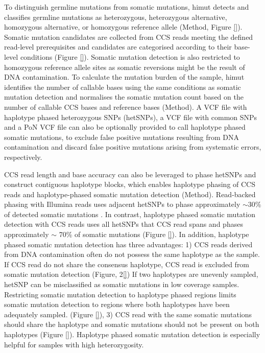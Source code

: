 To distinguish germline mutations from somatic mutations, himut detects and classifies germline mutations as heterozygous, heterozygous alternative, homozygous alternative, or homozygous reference allele (Method, Figure \ref{}). Somatic mutation candidates are collected from CCS reads meeting the defined read-level prerequisites and candidates are categorised according to their base-level conditions (Figure \ref{}). Somatic mutation detection is also restricted to homozygous reference allele sites as somatic reversions might be the result of DNA contamination. To calculate the mutation burden of the sample, himut identifies the number of callable bases using the same conditions as somatic mutation detection and normalises the somatic mutation count based on the number of callable CCS bases and reference bases (Method). A VCF file with haplotype phased heterozygous SNPs (hetSNPs), a VCF file with common SNPs and a PoN VCF file can also be optionally provided to call haplotype phased somatic mutations, to exclude false positive mutations resulting from DNA contamination and discard false positive mutations arising from systematic errors, respectively. 

CCS read length and base accuracy can also be leveraged to phase hetSNPs and construct contiguous haplotype blocks, which enables haplotype phasing of CCS reads and haplotype-phased somatic mutation detection (Method). Read-backed phasing with Illumina reads uses adjacent hetSNPs to phase approximately $\sim$30\% of detected somatic mutations \cite{}. In contrast, haplotype phased somatic mutation detection with CCS reads uses all hetSNPs that CCS read spans and phases approximately $\sim$ 70\% of somatic mutations (Figure \ref{}). In addition, haplotype phased somatic mutation detection has three advantages: 1) CCS reads derived from DNA contamination often do not possess the same haplotype as the sample. If CCS read do not share the consensus haplotype, CCS read is excluded from somatic mutation detection (Figure, 2\ref{}) If two haplotypes are unevenly sampled, hetSNP can be misclassified as somatic mutations in low coverage samples. Restricting somatic mutation detection to haplotype phased regions limits somatic mutation detection to regions where both haplotypes have been adequately sampled. (Figure \ref{}), 3) CCS read with the same somatic mutations should share the haplotype and somatic mutations should not be present on both haplotypes (Figure \ref{}). Haplotype phased somatic mutation detection is especially helpful for samples with high heterozygosity.

